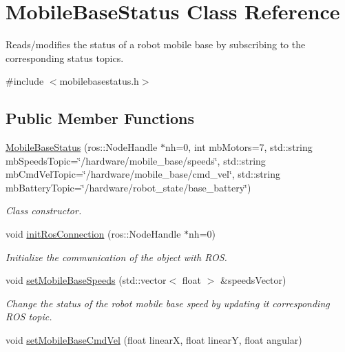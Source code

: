 \hypertarget{class_mobile_base_status}{}\section{Mobile\+Base\+Status Class Reference}
\label{class_mobile_base_status}


Reads/modifies the status of a robot mobile base by subscribing to the corresponding status topics.  




{\ttfamily \#include $<$mobilebasestatus.\+h$>$}

\subsection*{Public Member Functions}
\begin{DoxyCompactItemize}
\item 
\hyperlink{class_mobile_base_status_aa6d749ef6e47cc3ac293e3586d9e84e1}{Mobile\+Base\+Status} (ros\+::\+Node\+Handle $\ast$nh=0, int mb\+Motors=7, std\+::string mb\+Speeds\+Topic=\char`\"{}/hardware/mobile\+\_\+base/speeds\char`\"{}, std\+::string mb\+Cmd\+Vel\+Topic=\char`\"{}/hardware/mobile\+\_\+base/cmd\+\_\+vel\char`\"{}, std\+::string mb\+Battery\+Topic=\char`\"{}/hardware/robot\+\_\+state/base\+\_\+battery\char`\"{})
\begin{DoxyCompactList}\small\item\em Class constructor. \end{DoxyCompactList}\item 
void \hyperlink{class_mobile_base_status_afae5edeb924e04bc50ecbc04b38f13c6}{init\+Ros\+Connection} (ros\+::\+Node\+Handle $\ast$nh=0)
\begin{DoxyCompactList}\small\item\em Initialize the communication of the object with R\+OS. \end{DoxyCompactList}\item 
void \hyperlink{class_mobile_base_status_a051ef3d8ae09020198d6dd1c3bdb4bed}{set\+Mobile\+Base\+Speeds} (std\+::vector$<$ float $>$ \&speeds\+Vector)
\begin{DoxyCompactList}\small\item\em Change the status of the robot mobile base speed by updating it corresponding R\+OS topic. \end{DoxyCompactList}\item 
void \hyperlink{class_mobile_base_status_ae5c864fadd0a01f8669a8d7bdf0e2294}{set\+Mobile\+Base\+Cmd\+Vel} (float linearX, float linearY, float angular)

\end{DoxyCompactItemize}
